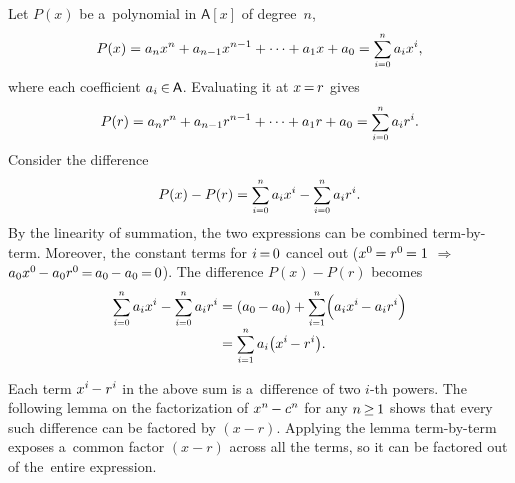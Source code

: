 \documentclass[11pt, twoside]{book}
\newcommand\nfex{\hspace{-0.2ex}} %
\newcommand\domain{\mathsf{A}}
\newcommand\polynomialring[1]{\domain[#1]}
\newcommand\cin{\nfex\in\nfex}
\newcommand\ceq{\nfex=\nfex}
\newcommand\cge{\nfex\ge\nfex}
\begin{document}
\nopagebreak
Let ${P(x)}$ be a~polynomial in $\polynomialring{x}$ of degree~$n$,
%
\vspace{-0.5em}
\begin{equation*}
P(x) = a_n x^n + a_{n-1} x^{n-1} + \dots + a_1 x + a_0 = \scalebox{.88}{$ \displaystyle\sum_{i=0}^{n} $} \, a_i x^i
,
\vspace{-0.25em}
\end{equation*}
where each coefficient ${a_i \cin \domain}$. Evaluating it at ${x \ceq r}$ gives
%
\vspace{-0.25em}
\begin{equation*}
P(r) = a_n r^n + a_{n-1} r^{n-1} + \dots + a_1 r + a_0 = \scalebox{.88}{$ \displaystyle\sum_{i=0}^{n} $} \, a_i r^i
.
\vspace{-0.25em}
\end{equation*}
%
Consider the difference
%
\vspace{-0.5em}
\begin{equation*}
P(x) - P(r)
= \scalebox{.88}{$ \displaystyle\sum_{i=0}^{n} $} \, a_i x^i - \scalebox{.88}{$ \displaystyle\sum_{i=0}^{n} $} \, a_i r^i .
\end{equation*}
%
By the linearity of summation, the two expressions can be combined term-by-term.
Moreover, the constant terms for ${i \ceq 0}$ cancel out
(${x^0 \nfex = r^0 \nfex = 1}$ $\Rightarrow$
${a_0 x^0 \nfex - a_0 r^0 \ceq a_0 \nfex - a_0 \ceq 0}$).
The difference ${P(x) - P(r)}$ becomes
%
\vspace{-0.25em}
\begin{align*}
\scalebox{.88}{$ \displaystyle\sum_{i=0}^{n} $} \, a_i x^i - \scalebox{.88}{$ \displaystyle\sum_{i=0}^{n} $} \, a_i r^i
&= (a_0 \nfex - a_0) + \scalebox{.88}{$ \displaystyle\sum_{i=1}^{n} $} \Bigl( a_i x^i \nfex - a_i r^i \Bigr)
\\[-0.33em]
&= \scalebox{.88}{$ \displaystyle\sum_{i=1}^{n} $} \, a_i \bigl( x^i \nfex - r^i \bigr)
.
\vspace{-0.25em}
\end{align*}

\vspace{-0.75em}
Each term ${x^i \nfex - r^i}$ in the above sum is a~difference of two $i$-th powers.
The following lemma on the factorization of ${x^n \nfex - c^n}$ for any ${n \cge 1}$ shows that every such difference can be factored by ${(x - r)}$.
Applying the lemma term-by-term exposes a~common factor ${(x - r)}$ across all the terms, so it can be factored out of the~entire expression.
\end{document}
